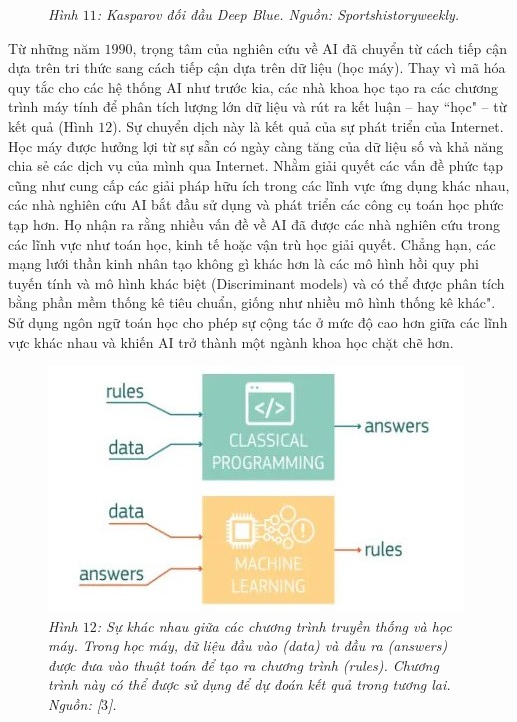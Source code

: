 \begin{multicols}{2}
\begin{figure}[H]
		\caption{\small\textit{\color{cackithi}Hình $11$: Kasparov đối đầu Deep Blue. Nguồn: Sportshistoryweekly.}}
		\vspace*{-10pt}
	\end{figure}
	Từ những năm $1990$, trọng tâm của nghiên cứu về AI đã chuyển từ cách tiếp cận dựa trên tri thức sang cách tiếp cận dựa trên dữ liệu (học máy). Thay vì mã hóa quy tắc cho các hệ thống AI như trước kia, các nhà khoa học tạo ra các chương trình máy tính để phân tích lượng lớn dữ liệu và rút ra kết luận -- hay ``học" -- từ kết quả (Hình $12$). Sự chuyển dịch này là kết quả của sự phát triển của Internet. Học máy được hưởng lợi từ sự sẵn có ngày càng tăng của dữ liệu số và khả năng chia sẻ các dịch vụ của mình qua Internet. 
	\vskip 0.1cm
	Nhằm giải quyết các vấn đề phức tạp cũng như cung cấp các giải pháp hữu ích trong các lĩnh vực ứng dụng khác nhau, các nhà nghiên cứu AI bắt đầu sử dụng và phát triển các công cụ toán học phức tạp hơn. Họ nhận ra rằng nhiều vấn đề về AI đã được các nhà nghiên cứu trong các lĩnh vực như toán học, kinh tế hoặc vận trù học giải quyết. Chẳng hạn, các mạng lưới thần kinh nhân tạo không gì khác hơn là các mô hình hồi quy phi tuyến tính và mô hình khác biệt (Discriminant models) và có thể được phân tích bằng phần mềm thống kê tiêu chuẩn, giống như nhiều mô hình thống kê khác". Sử dụng ngôn ngữ toán học cho phép sự cộng tác ở mức độ cao hơn giữa các lĩnh vực khác nhau và khiến AI trở thành một ngành khoa học chặt chẽ hơn.
	\begin{figure}[H]
		\vspace*{-5pt}
		\centering
		\captionsetup{labelformat= empty, justification=centering}
		\includegraphics[width= 0.9\linewidth]{ML-TraditionalProgramming.jpeg}
		\caption{\small\textit{\color{cackithi}Hình $12$: Sự khác nhau giữa các chương trình truyền thống và học máy. Trong học máy, dữ liệu đầu vào (data) và đầu ra (answers) được đưa vào thuật toán để tạo ra chương trình (rules). Chương trình này có thể được sử dụng để dự đoán kết quả trong tương lai. Nguồn: [$3$].}}

\end{figure}
\end{multicols}
